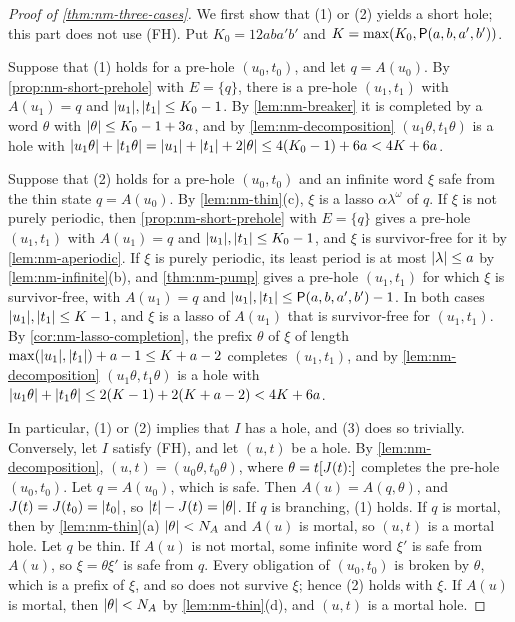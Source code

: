 \begin{proof}[Proof of \cref{thm:nm-three-cases}]
We first show that (1) or (2) yields a short hole; this part does not use
(FH). Put $K_0=12aba'b'$ and $K=\max(K_0,\mathsf P(a,b,a',b'))$.

Suppose that (1) holds for a pre-hole $(u_0,t_0)$, and let $q=A(u_0)$. By
\cref{prop:nm-short-prehole} with $E=\{q\}$, there is a pre-hole $(u_1,t_1)$
with $A(u_1)=q$ and $\lvert u_1\rvert,\lvert t_1\rvert\le K_0-1$. By \cref{lem:nm-breaker} it is
completed by a word $\theta$ with $\lvert \theta\rvert\le K_0-1+3a$, and by
\cref{lem:nm-decomposition} $(u_1\theta,t_1\theta)$ is a hole with
$\lvert u_1\theta\rvert+\lvert t_1\theta\rvert=\lvert u_1\rvert+\lvert t_1\rvert+2\lvert \theta\rvert\le
4(K_0-1)+6a<4K+6a$.

Suppose that (2) holds for a pre-hole $(u_0,t_0)$ and an infinite word $\xi$ safe
from the thin state $q=A(u_0)$. By \cref{lem:nm-thin}(c), $\xi$ is a lasso
$\alpha\lambda^\omega$ of $q$. If $\xi$ is not purely periodic, then
\cref{prop:nm-short-prehole} with $E=\{q\}$ gives a pre-hole $(u_1,t_1)$ with
$A(u_1)=q$ and $\lvert u_1\rvert,\lvert t_1\rvert\le K_0-1$, and $\xi$ is survivor-free for it
by \cref{lem:nm-aperiodic}. If $\xi$ is purely periodic, its least period is at
most $\lvert \lambda\rvert\le a$ by \cref{lem:nm-infinite}(b), and \cref{thm:nm-pump}
gives a pre-hole $(u_1,t_1)$ for which $\xi$ is survivor-free, with $A(u_1)=q$
and $\lvert u_1\rvert,\lvert t_1\rvert\le\mathsf P(a,b,a',b')-1$. In both cases
$\lvert u_1\rvert,\lvert t_1\rvert\le K-1$, and $\xi$ is a lasso of $A(u_1)$ that is
survivor-free for $(u_1,t_1)$. By \cref{cor:nm-lasso-completion}, the prefix
$\theta$ of $\xi$ of length $\max(\lvert u_1\rvert,\lvert t_1\rvert)+a-1\le K+a-2$ completes
$(u_1,t_1)$, and by \cref{lem:nm-decomposition} $(u_1\theta,t_1\theta)$ is a
hole with $\lvert u_1\theta\rvert+\lvert t_1\theta\rvert\le2(K-1)+2(K+a-2)<4K+6a$.

In particular, (1) or (2) implies that $I$ has a hole, and (3) does so
trivially. Conversely, let $I$ satisfy (FH), and let $(u,t)$ be a hole. By
\cref{lem:nm-decomposition}, $(u,t)=(u_0\theta,t_0\theta)$, where
$\theta=t[J(t){:}]$ completes the pre-hole $(u_0,t_0)$. Let $q=A(u_0)$, which
is safe. Then $A(u)=A(q,\theta)$, and $J(t)=J(t_0)=\lvert t_0\rvert$, so
$\lvert t\rvert-J(t)=\lvert \theta\rvert$. If $q$ is branching, (1) holds. If $q$ is mortal,
then by \cref{lem:nm-thin}(a) $\lvert \theta\rvert<N_A$ and $A(u)$ is mortal, so $(u,t)$
is a mortal hole. Let $q$ be thin. If $A(u)$ is not mortal, some infinite word
$\xi'$ is safe from $A(u)$, so $\xi=\theta\xi'$ is safe from $q$. Every
obligation of $(u_0,t_0)$ is broken by $\theta$, which is a prefix of $\xi$, and
so does not survive $\xi$; hence (2) holds with $\xi$. If $A(u)$ is mortal, then
$\lvert \theta\rvert<N_A$ by \cref{lem:nm-thin}(d), and $(u,t)$ is a mortal hole.
\end{proof}
